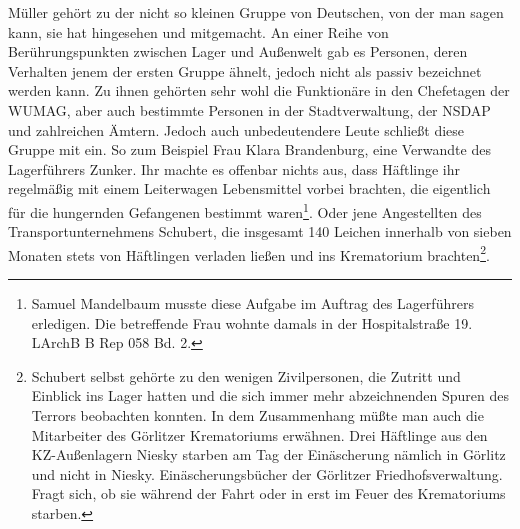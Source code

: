 Müller gehört zu der nicht so kleinen Gruppe von Deutschen, von der man sagen kann, sie hat \glqq hingesehen und mitgemacht\grqq. An einer Reihe von  Berührungspunkten zwischen Lager und Außenwelt gab es Personen, deren Verhalten jenem der ersten Gruppe ähnelt, jedoch nicht als passiv bezeichnet werden kann. Zu ihnen gehörten sehr wohl die Funktionäre in den Chefetagen der WUMAG, aber auch bestimmte Personen in der Stadtverwaltung, der NSDAP und zahlreichen Ämtern. Jedoch auch unbedeutendere Leute schließt diese Gruppe mit ein. So zum Beispiel Frau Klara Brandenburg, eine Verwandte des Lagerführers Zunker. Ihr machte es offenbar nichts aus, dass Häftlinge ihr regelmäßig mit einem Leiterwagen Lebensmittel vorbei brachten, die eigentlich für die hungernden Gefangenen bestimmt waren\footnote{Samuel Mandelbaum musste diese Aufgabe im Auftrag des Lagerführers erledigen. Die betreffende Frau wohnte damals in der Hospitalstraße 19. LArchB B Rep 058 Bd. 2.}. Oder jene Angestellten des Transportunternehmens Schubert, die insgesamt 140 Leichen innerhalb von sieben Monaten stets von Häftlingen verladen ließen und ins Krematorium brachten\footnote{Schubert selbst gehörte zu den wenigen Zivilpersonen, die Zutritt und Einblick ins Lager hatten und die sich immer mehr abzeichnenden Spuren des Terrors beobachten konnten. In dem Zusammenhang müßte man auch die Mitarbeiter des Görlitzer Krematoriums erwähnen. Drei Häftlinge aus den KZ-Außenlagern Niesky starben am Tag der Einäscherung nämlich in Görlitz und nicht in Niesky. Einäscherungsbücher der Görlitzer Friedhofsverwaltung. Fragt sich, ob sie während der Fahrt oder in erst im Feuer des Krematoriums starben.}.
~\newline
